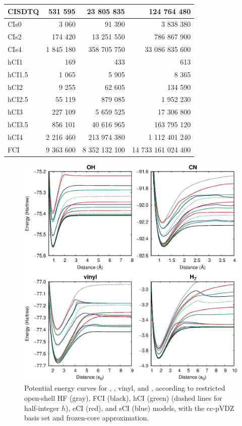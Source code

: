 \documentclass[aip,jcp,preprint,noshowkeys,superscriptaddress]{revtex4-1}
\begin{document}
\begin{table}[ht!]
{\begin{ruledtabular}
\begin{tabular}{lrrr}
CISDTQ &    531 595 &    23 805 835 &        124 764 480 \\
\hline
CIs0   &      3 060 &        91 390 &          3 838 380 \\
CIs2   &    174 420 &    13 251 550 &        786 867 900 \\
CIs4   &  1 845 180 &   358 705 750 &     33 086 835 600 \\
\hline
hCI1   &        169 &           433 &                613 \\
hCI1.5 &      1 065 &         5 905 &              8 365 \\
hCI2   &      9 255 &        62 605 &            134 590 \\
hCI2.5 &     55 119 &       879 085 &          1 952 230 \\
hCI3   &    227 109 &     5 659 525 &         17 306 800 \\
hCI3.5 &    856 101 &    40 616 965 &        163 795 120 \\
hCI4   &  2 216 460 &   213 974 380 &      1 112 401 240 \\
\hline
FCI    &  9 363 600 & 8 352 132 100 & 14 733 161 024 400 \\
\end{tabular}
\end{ruledtabular}
}
\end{table}

\clearpage

\begin{figure}%
\includegraphics[width=1.0\linewidth]{plot_pes}
\caption{
Potential energy curves for , , vinyl, and ,
according to restricted open-shell HF (gray), FCI (black), hCI (green) (dashed lines for half-integer $h$), eCI (red), and sCI (blue) models, with the cc-pVDZ basis set and frozen-core approximation.}
\label{fig:plot_pes}
\end{figure}
\end{document}
